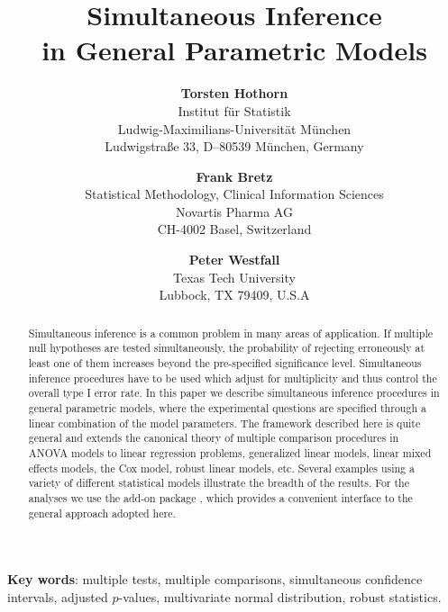\documentclass[12pt]{article}
\begin{document}
\title{Simultaneous Inference \\
in General Parametric Models}
\author{\textbf{Torsten Hothorn} \\
Institut f{\"u}r Statistik \\
Ludwig-Maximilians-Universit{\"a}t M{\"u}nchen \\
Ludwigstra{\ss }e 33, D--80539 M{\"u}nchen, Germany\\
\and \textbf{Frank Bretz} \\
Statistical Methodology, Clinical Information Sciences\\
Novartis Pharma AG \\
CH-4002 Basel, Switzerland \\
\and \textbf{Peter Westfall} \\
Texas Tech University \\
Lubbock, TX 79409, U.S.A}
\maketitle

\begin{abstract}
Simultaneous inference is a common problem in many areas of application. If
multiple null hypotheses are tested simultaneously, the probability of
rejecting erroneously at least one of them increases beyond the
pre-specified significance level. Simultaneous inference procedures have to
be used which adjust for multiplicity and thus control the overall type I
error rate. In this paper we describe simultaneous inference procedures in
general parametric models, where the experimental questions are specified
through a linear combination of the model parameters. The framework
described here is quite general and extends the canonical theory of multiple
comparison procedures in ANOVA models to linear regression problems,
generalized linear models, linear mixed effects models, the Cox model,
robust linear models, etc. Several examples using a variety of different
statistical models illustrate the breadth of the results. For the analyses
we use the \RR{} add-on package , which provides a
convenient interface to the general approach adopted here.
\end{abstract}

\thispagestyle{empty} \setcounter{page}{0}

\textbf{Key words}: multiple tests, multiple comparisons, simultaneous
confidence intervals, \newline
adjusted $p$-values, multivariate normal distribution, robust statistics.
\end{document}
